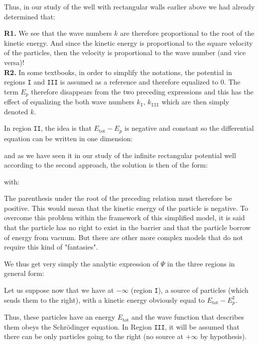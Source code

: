 	Thus, in our study of the well with rectangular walls earlier above we had already determined that:
	
	\begin{tcolorbox}[title=Remarks,colframe=black,arc=10pt]
	\textbf{R1.} We see that the wave numbers $k$ are therefore proportional to the root of the kinetic energy. And since the kinetic energy is proportional to the square velocity of the particles, then the velocity is proportional to the wave number (and vice versa)!\\

	\textbf{R2.} In some textbooks, in order to simplify the notations, the potential in regions \texttt{I} and \texttt{III} is assumed as a reference and therefore equalized to $0$. The term $E_p$ therefore disappears from the two preceding expressions and this has the effect of equalizing the both wave numbers $k_{\texttt{I}}$, $k_{\texttt{III}}$ which are then simply denoted $k$.
	\end{tcolorbox}
	In region \texttt{II}, the idea is that $E_{\text{tot}}-E_p$ is negative and constant so the differential equation can be written in one dimension:
	
	and as we have seen it in our study of the infinite rectangular potential well according to the second approach, the solution is then of the form:
	
	with:
	
	\begin{tcolorbox}[title=Remark,colframe=black,arc=10pt]
	The parenthesis under the root of the preceding relation must therefore be positive. This would mean that the kinetic energy of the particle is negative. To overcome this problem within the framework of this simplified model, it is said that the particle has no right to exist in the barrier and that the particle borrow of energy from vacuum. But there are other more complex models that do not require this kind of "fantasies".
	\end{tcolorbox}
	We thus get very simply the analytic expression of $\Psi$ in the three regions in general form:
	
	Let us suppose now that we have at $-\infty$ (region \texttt{I}), a source of particles (which sends them to the right), with a kinetic energy obviously equal to $E_{\text{tot}}-E_{p}^{\texttt{I}}$.
	
	Thus, these particles have an energy $E_\text{tot}$ and the wave function that describes them obeys the Schrödinger equation. In Region \texttt{III}, it will be assumed that there can be only particles going to the right (no source at $+\infty$ by hypothesis).

